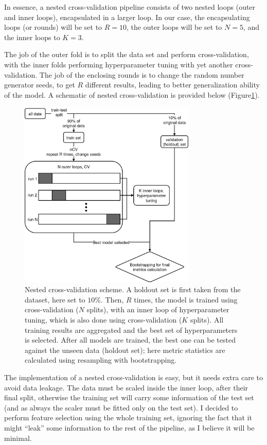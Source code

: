 \documentclass[12pt]{article}
\begin{document}
In essence, a nested cross-validation pipeline consists of two nested loops
(outer and inner loops), encapsulated in a larger loop. In our case, the
encapsulating loops (or rounds) will be set to $R=10$, the outer loops will be
set to $N=5$, and the inner loops to $K=3$.

The job of the outer fold is to split the data set and perform cross-validation,
with the inner folds performing hyperparameter tuning with yet another
cross-validation. The job of the enclosing rounds is to change the random number
generator seeds, to get $R$ different results, leading to better generalization
ability of the model. A schematic of nested cross-validation is provided below
(Figure\ref{fig:ncv_scheme}).

\begin{figure}[H]
    \centering
    \includegraphics[width=0.75\textwidth]{ims/nCV.drawio.png}
    \caption{Nested cross-validation scheme. A holdout set is first taken from
    the dataset, here set to $10\%$. Then, $R$ times, the model is trained
    using cross-validation ($N$ splits), with an inner loop of hyperparameter
    tuning, which is also done using cross-validation ($K$ splits). All
    training results are aggregated and the best set of hyperparameters
    is selected. After all models are trained, the best one can be tested
    against the unseen data (holdout set); here metric statistics are
    calculated using resampling with bootstrapping.}
    \label{fig:ncv_scheme}
\end{figure}

The implementation of a nested cross-validation is easy, but it needs extra
care to avoid data leakage. The data must be scaled inside the inner loop, after
their final split, otherwise the training set will carry some information of the
test set (and as always the scaler must be fitted only on the test set). I
decided to perform feature selection using the whole training set, ignoring the
fact that it might ``leak'' some information to the rest of the pipeline, as I
believe it will be minimal.
\end{document}
